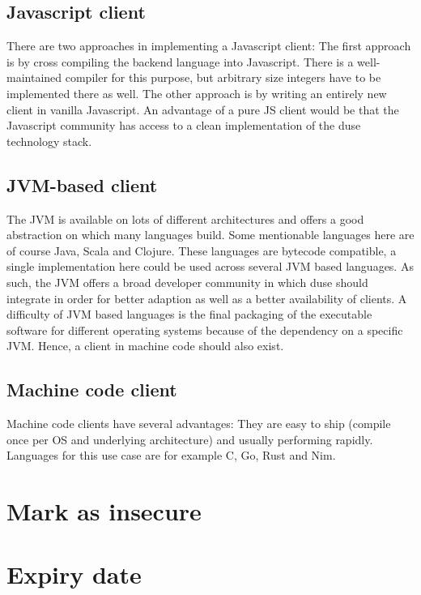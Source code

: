 \subsection{Javascript client}

There are two approaches in implementing a Javascript client: The first
approach is by cross compiling the backend language into Javascript. There
is a well-maintained compiler for this purpose, but arbitrary size integers
have to be implemented there as well. The other approach is by writing
an entirely new client in vanilla Javascript. An advantage of a pure JS
client would be that the Javascript community has access to a clean
implementation of the duse technology stack.

\subsection{JVM-based client}

The JVM is available on lots of different architectures and offers a good 
abstraction on which many languages build. Some mentionable languages here are
of course Java, Scala and Clojure. These languages are bytecode compatible,
a single implementation here could be used across several JVM based languages.
As such, the JVM offers a broad developer community in which duse should
integrate in order for better adaption as well as a better availability of
clients. A difficulty of JVM based languages is the final packaging of the
executable software for different operating systems because of the dependency
on a specific JVM. Hence, a client in machine code should also exist.

\subsection{Machine code client}

Machine code clients have several advantages: They are easy to ship (compile
once per OS and underlying architecture) and usually performing rapidly.
Languages for this use case are for example C, Go, Rust and Nim.

\section{Mark as insecure}
\section{Expiry date}

